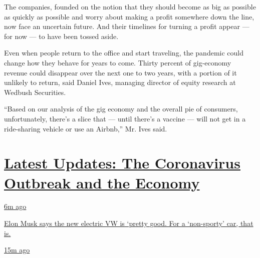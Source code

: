 The companies, founded on the notion that they should become as big as
possible as quickly as possible and worry about making a profit
somewhere down the line, now face an uncertain future. And their
timelines for turning a profit appear --- for now --- to have been
tossed aside.

Even when people return to the office and start traveling, the pandemic
could change how they behave for years to come. Thirty percent of
gig-economy revenue could disappear over the next one to two years, with
a portion of it unlikely to return, said Daniel Ives, managing director
of equity research at Wedbush Securities.

``Based on our analysis of the gig economy and the overall pie of
consumers, unfortunately, there's a slice that --- until there's a
vaccine --- will not get in a ride-sharing vehicle or use an Airbnb,''
Mr. Ives said.

\hypertarget{latest-updates-the-coronavirus-outbreak-and-the-economy}{%
\section{\texorpdfstring{\href{https://www.nytimes3xbfgragh.onion/live/2020/09/08/business/stock-market-today-coronavirus?action=click\&pgtype=Article\&state=default\&region=MAIN_CONTENT_1\&context=storylines_live_updates}{Latest
Updates: The Coronavirus Outbreak and the
Economy}}{Latest Updates: The Coronavirus Outbreak and the Economy}}\label{latest-updates-the-coronavirus-outbreak-and-the-economy}}

\href{https://www.nytimes3xbfgragh.onion/live/2020/09/08/business/stock-market-today-coronavirus?action=click\&pgtype=Article\&state=default\&region=MAIN_CONTENT_1\&context=storylines_live_updates\#elon-musk-says-the-new-electric-vw-is-pretty-good-for-a-non-sporty-car-that-is}{6m
ago}

\href{https://www.nytimes3xbfgragh.onion/live/2020/09/08/business/stock-market-today-coronavirus?action=click\&pgtype=Article\&state=default\&region=MAIN_CONTENT_1\&context=storylines_live_updates\#elon-musk-says-the-new-electric-vw-is-pretty-good-for-a-non-sporty-car-that-is}{Elon
Musk says the new electric VW is `pretty good. For a `non-sporty' car,
that is.}

\href{https://www.nytimes3xbfgragh.onion/live/2020/09/08/business/stock-market-today-coronavirus?action=click\&pgtype=Article\&state=default\&region=MAIN_CONTENT_1\&context=storylines_live_updates\#wage-violations-have-spiked-as-low-paid-workers-become-more-vulnerable-study-says}{15m
ago}

